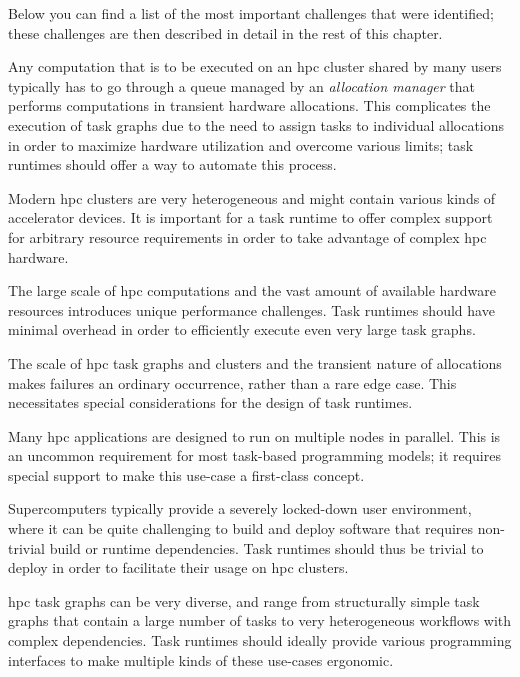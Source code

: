 Below you can find a list of the most important challenges that were identified; these
challenges are then described in detail in the rest of this chapter.

\begin{description}[wide=0pt, itemsep=1pt]
	\item[Allocation manager] Any computation that is to be executed on an \gls{hpc} cluster
	shared by many users typically has to go through a queue managed by an
	\emph{allocation manager} that performs computations in transient hardware allocations. This
	complicates the execution of task graphs due to the need to assign tasks to individual
	allocations in order to maximize hardware utilization and overcome various limits; task
	runtimes should offer a way to automate this process.
	\item[Cluster heterogeneity] Modern \gls{hpc} clusters are very heterogeneous and might
	contain various kinds of accelerator devices. It is important for a task runtime to offer
	complex support for arbitrary resource requirements in order to take advantage of complex
	\gls{hpc} hardware.
	\item[Performance and scalability] The large scale of \gls{hpc} computations and the vast
	amount of available hardware resources introduces unique performance challenges. Task
	runtimes should have minimal overhead in order to efficiently execute even very large task
	graphs.
	\item[Fault tolerance] The scale of \gls{hpc} task graphs and clusters and the transient
	nature of allocations makes failures an ordinary occurrence, rather than a rare edge case.
	This necessitates special considerations for the design of task runtimes.
	\item[Multi-node tasks] Many \gls{hpc} applications are designed to run on multiple nodes in
	parallel. This is an uncommon requirement for most task-based programming models; it
	requires special support to make this use-case a first-class concept.
	\item[Deployment] Supercomputers typically provide a severely locked-down user environment,
	where it can be quite challenging to build and deploy software that requires non-trivial
	build or runtime dependencies. Task runtimes should thus be trivial to deploy in order to
	facilitate their usage on \gls{hpc} clusters.
	\item[Programming model flexibility] \gls{hpc} task graphs can be very diverse, and
	range from structurally simple task graphs that contain a large number of tasks to very
	heterogeneous workflows with complex dependencies. Task runtimes should ideally provide
	various programming interfaces to make multiple kinds of these use-cases ergonomic.
\end{description}

